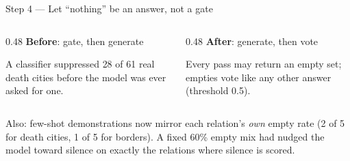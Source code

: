 \documentclass[aspectratio=169,10pt]{beamer}
\begin{document}
\begin{frame}{Step 4 --- Let ``nothing'' be an answer, not a gate}
  \begin{columns}[T]
    \begin{column}{0.48\textwidth}
      \centering
      \textcolor{other}{\textbf{Before}: gate, then generate}

      \vspace{2mm}

      \vspace{2mm}
      \small A classifier suppressed \textcolor{bad}{28 of 61} real death
      cities before the model was ever asked for one.
    \end{column}
    \begin{column}{0.48\textwidth}
      \centering
      \textcolor{accent}{\textbf{After}: generate, then vote}

      \vspace{2mm}

      \vspace{2mm}
      \small Every pass may return an empty set; empties vote like any other
      answer (threshold 0.5).
    \end{column}
  \end{columns}

  \vspace{4mm}
  Also: few-shot demonstrations now mirror each relation's \emph{own} empty
  rate (2 of 5 for death cities, 1 of 5 for borders). A fixed 60\% empty mix
  had nudged the model toward silence on exactly the relations where silence
  is scored.
\end{frame}
\end{document}
